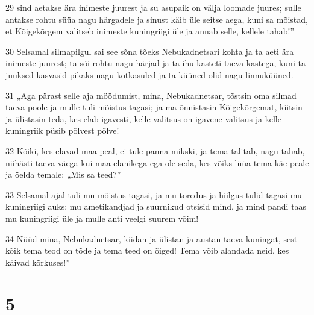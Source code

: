 \par 29 sind aetakse ära inimeste juurest ja su asupaik on välja loomade juures; sulle antakse rohtu süüa nagu härgadele ja sinust käib üle seitse aega, kuni sa mõistad, et Kõigekõrgem valitseb inimeste kuningriigi üle ja annab selle, kellele tahab!”
\par 30 Selsamal silmapilgul sai see sõna tõeks Nebukadnetsari kohta ja ta aeti ära inimeste juurest; ta sõi rohtu nagu härjad ja ta ihu kasteti taeva kastega, kuni ta juuksed kasvasid pikaks nagu kotkasuled ja ta küüned olid nagu linnuküüned.
\par 31 „Aga pärast selle aja möödumist, mina, Nebukadnetsar, tõstsin oma silmad taeva poole ja mulle tuli mõistus tagasi; ja ma õnnistasin Kõigekõrgemat, kiitsin ja ülistasin teda, kes elab igavesti, kelle valitsus on igavene valitsus ja kelle kuningriik püsib põlvest põlve!
\par 32 Kõiki, kes elavad maa peal, ei tule panna mikski, ja tema talitab, nagu tahab, niihästi taeva väega kui maa elanikega ega ole seda, kes võiks lüüa tema käe peale ja öelda temale: „Mis sa teed?”
\par 33 Selsamal ajal tuli mu mõistus tagasi, ja mu toredus ja hiilgus tulid tagasi mu kuningriigi auks; mu ametikandjad ja suurnikud otsisid mind, ja mind pandi taas mu kuningriigi üle ja mulle anti veelgi suurem võim!
\par 34 Nüüd mina, Nebukadnetsar, kiidan ja ülistan ja austan taeva kuningat, sest kõik tema teod on tõde ja tema teed on õiged! Tema võib alandada neid, kes käivad kõrkuses!”

\chapter{5}

